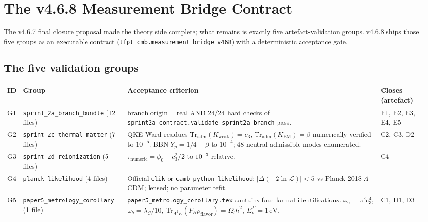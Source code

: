 \section{The v4.6.8 Measurement Bridge Contract}
\label{sec:measurement468}

The v4.6.7 final closure proposal made the theory side complete; what
remains is exactly five artefact-validation groups.  v4.6.8 ships
those five groups as an executable contract
(\texttt{tfpt\_cmb.measurement\_bridge\_v468}) with a deterministic
acceptance gate.

\subsection{The five validation groups}

\begin{center}
\renewcommand{\arraystretch}{1.18}
\begin{tabularx}{\textwidth}{@{}p{}p{}p{}Y@{}}
\toprule
\textbf{ID} & \textbf{Group} & \textbf{Acceptance criterion} & \textbf{Closes (artefact)} \\
\midrule
G1 & \texttt{sprint\_2a\_branch\_bundle} (12 files) &
\(\mathrm{branch\_origin}=\mathrm{real}\) AND 24/24 hard checks of
\texttt{sprint2a\_contract.validate\_sprint2a\_branch} pass.
& E1, E2, E3, E4, E5 \\
G2 & \texttt{sprint\_2c\_thermal\_matter} (7 files) &
QKE Ward residues
\(\mathrm{Tr}_{\mathrm{adm}}(K_{\mathrm{weak}})=c_3\),
\(\mathrm{Tr}_{\mathrm{adm}}(K_{\mathrm{EM}})=\beta\) numerically
verified to \(10^{-5}\); BBN \(Y_p=1/4-\beta\) to \(10^{-4}\); 48
neutral admissible modes enumerated.
& C2, C3, D2 \\
G3 & \texttt{sprint\_2d\_reionization} (5 files) &
\(\tau_{\mathrm{numeric}}=\phi_0+c_3^2/2\) to \(10^{-3}\) relative.
& C4 \\
G4 & \texttt{planck\_likelihood} (4 files) &
Official \texttt{clik} or \texttt{camb\_python\_likelihood};
\(|\Delta(-2\ln\mathcal L)|<5\) vs Planck-2018 \(\Lambda\)CDM;
lensed; no parameter refit.
& --- \\
G5 & \texttt{paper5\_metrology\_corollary} (1 file) &
\texttt{paper5\_metrology\_corollary.tex} contains four formal
identifications: \(\omega_\gamma=\pi^2 c_3^4\),
\(\omega_b=\lambda_C/10\), \(\mathrm{Tr}_{\Lambda^2 E}(P_B\rho_{\mathrm{flavor}})=\Omega_b h^2\),
\(E_\nu^\Sigma=1\,\mathrm{eV}\).
& C1, D1, D3 \\
\bottomrule
\end{tabularx}
\end{center}

